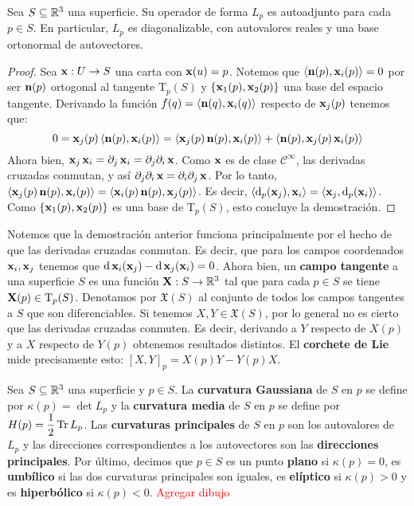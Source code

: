 \begin{prop}
Sea $S\subseteq\RR^3$ una superficie. Su operador de forma $L_p$ es autoadjunto para cada $p\in S$. En particular, $L_p$ es diagonalizable, con autovalores reales y una base ortonormal de autovectores.
\begin{proof}
Sea $\x:U\to S$ una carta con $\x(u)=p$. Notemos que $\pint{\n(p),\x_i(p)}=0$ por ser $\n(p)$ ortogonal al tangente $\mathrm{T}_p(S)$ y $\{\x_1(p),\x_2(p)\}$ una base del espacio tangente. Derivando la función $f(q)=\pint{\n(q),\x_i(q)}$ respecto de $\x_j(p)$ tenemos que: $$0 = \x_j(p)\pint{\n(p),\x_i(p)} = \pint{\x_j(p)\n(p),\x_i(p)} + \pint{\n(p),\x_j(p)\x_i(p)}$$ Ahora bien, $\x_j\x_i=\partial_j\x_i=\partial_j\partial_i\x$. Como $\x$ es de clase $\mathscr{C}^\infty$, las derivadas cruzadas conmutan, y así $\partial_j\partial_i\x = \partial_i\partial_j\x$. Por lo tanto, $\pint{\x_j(p)\n(p),\x_i(p)} = \pint{\x_i(p)\n(p),\x_j(p)}$. Es decir, $\pint{\diff_p(\x_j),\x_i} = \pint{\x_j,\diff_p(\x_i)}$. Como $\{\x_1(p),\x_2(p)\}$ es una base de $\mathrm{T}_p(S)$, esto concluye la demostración.
\end{proof}
\end{prop}

Notemos que la demostración anterior funciona principalmente por el hecho de que las derivadas cruzadas conmutan. Es decir, que para los campos coordenados $\x_i,\x_j$ tenemos que $\diff\x_i(\x_j) - \diff\x_j(\x_i)=0$. Ahora bien, un \textbf{campo tangente} a una superficie $S$ es una función $\X:S\to\RR^3$ tal que para cada $p\in S$ se tiene $\X(p)\in\mathrm{T}_p(S)$. Denotamos por $\mathfrak{X}(S)$ al conjunto de todos los campos tangentes a $S$ que son diferenciables. Si tenemos $X,Y\in\mathfrak{X}(S)$, por lo general no es cierto que las derivadas cruzadas conmuten. Es decir, derivando a $Y$ respecto de $X(p)$ y a $X$ respecto de $Y(p)$ obtenemos resultados distintos. El \textbf{corchete de Lie} mide precisamente esto: $[X,Y]_p=X(p)Y-Y(p)X$.

\begin{defn}
Sea $S\subseteq\RR^3$ una superficie y $p\in S$. La \textbf{curvatura Gaussiana} de $S$ en $p$ se define por $\kappa(p)=\det L_p$ y la \textbf{curvatura media} de $S$ en $p$ se define por $H(p)=\dfrac{1}{2}\tr L_p$. Las \textbf{curvaturas principales} de $S$ en $p$ son los autovalores de $L_p$ y las direcciones correspondientes a los autovectores son las \textbf{direcciones principales}. Por último, decimos que $p\in S$ es un punto \textbf{plano} si $\kappa(p)=0$, es \textbf{umbílico} si las dos curvaturas principales son iguales, es \textbf{elíptico} si $\kappa(p)>0$ y es \textbf{hiperbólico} si $\kappa(p)<0$. \textcolor{red}{Agregar dibujo}
\end{defn}

